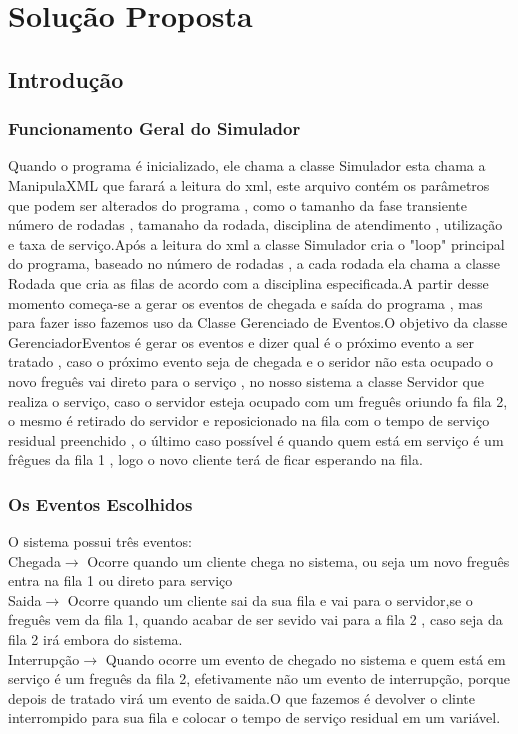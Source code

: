 \documentclass[a4paper,10pt]{article}
\begin{document}
\section{Solução Proposta}
      \subsection{Introdução}
	\subsubsection{Funcionamento Geral do Simulador}
	Quando o programa é inicializado, ele chama a classe Simulador esta chama a ManipulaXML que farará a leitura do xml, este arquivo contém os parâmetros que podem ser alterados do programa , como o tamanho da fase transiente
	número de rodadas , tamanaho da rodada, disciplina de atendimento , utilização e taxa de serviço.Após a leitura do xml a classe Simulador cria o "loop" principal do programa, baseado no número de rodadas , a cada rodada ela chama 
	a classe Rodada que cria  as filas de acordo com a disciplina especificada.A partir desse momento começa-se a gerar os eventos de chegada e saída do programa , mas para fazer isso fazemos uso da Classe Gerenciado de Eventos.O objetivo
	da classe GerenciadorEventos é gerar os eventos e dizer qual é o próximo evento a ser tratado , caso o próximo evento seja de chegada e o seridor não esta ocupado o novo freguês vai direto para o serviço , no nosso sistema a classe Servidor
	que realiza o serviço, caso o servidor esteja ocupado com um freguês oriundo fa fila 2, o mesmo é retirado do servidor e reposicionado na fila com o tempo de serviço residual preenchido , o último caso possível é quando quem está em serviço
	é um frêgues da fila 1 , logo o novo cliente terá de ficar esperando na fila.
 	\subsubsection{Os Eventos Escolhidos}
	O sistema possui três eventos:\\
	Chegada$\to$ Ocorre quando um cliente chega no sistema, ou seja um novo freguês entra na fila 1 ou direto para serviço \\
	Saida$\to$ Ocorre quando um cliente sai da sua fila e vai para o servidor,se o freguês vem da fila 1, quando acabar de ser sevido vai para a fila 2 , caso seja da fila 2 irá embora do sistema.\\
	Interrupção$\to$ Quando ocorre um evento de chegado no sistema e quem está em serviço  é um freguês da fila 2, efetivamente não um evento de interrupção, porque depois de tratado virá um evento de saida.O que fazemos 
	é devolver o clinte interrompido para sua fila e colocar o tempo de serviço residual em um variável.\\
\end{document}
